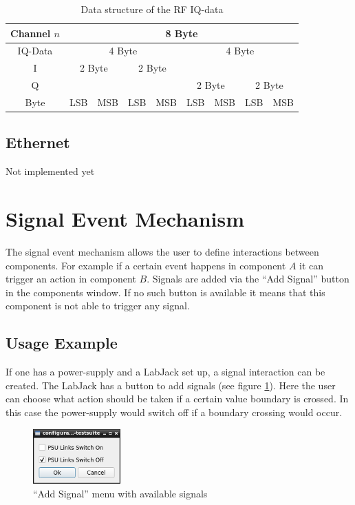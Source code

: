 \documentclass[10pt,a4paper]{article}
\begin{document}
		\begin{table}[H]
		\centering
		\begin{tabular}{c|cc|cc|cc|cc}
		\toprule
		Channel $n$	& \multicolumn{8}{c}{8 Byte}\\ \midrule
		IQ-Data		& \multicolumn{4}{c}{4 Byte} & \multicolumn{4}{|c}{4 Byte} \\ \hline 
		I	& \multicolumn{2}{c}{2 Byte} & \multicolumn{2}{c}{2 Byte} & \multicolumn{4}{|c}{} \\ 
		Q	& \multicolumn{4}{c}{} & \multicolumn{2}{|c}{2 Byte} & \multicolumn{2}{c}{2 Byte} \\  \hline
		Byte		& LSB & MSB & LSB & MSB & LSB & MSB & LSB & MSB \\ \bottomrule
		\end{tabular}
		\caption{Data structure of the RF IQ-data}
		\label{t:rf_data}
		\end{table}
		
	\newpage
	\subsection{Ethernet}
	Not implemented yet

\newpage
\section{Signal Event Mechanism}
\label{c:signal_event_mechanism}

The signal event mechanism allows the user to define interactions between components. For example if a certain event happens in component $A$ it can trigger an action in component $B$. Signals are added via the \enquote{Add Signal} button in the components window. If no such button is available it means that this component is not able to trigger any signal.

	\subsection{Usage Example}
	
	If one has a power-supply and a LabJack set up, a signal interaction can be created. The LabJack has a button to add signals (see figure \ref{f:sem_menu}). Here the user can choose what action should be taken if a certain value boundary is crossed. In this case the power-supply would switch off if a boundary crossing would occur.
	
	\begin{figure}[H]
	\centering
	\includegraphics[width=0.3\textwidth]{./5_sem_menu.png}
	\caption{\enquote{Add Signal} menu with available signals}
	\label{f:sem_menu}
	\end{figure}
\end{document}
